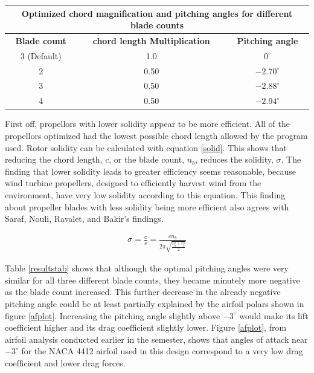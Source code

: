\documentclass[journal ]{new-aiaa}
\begin{document}
\begin{center}
\label{resultstab}
\begin{tabular}{| c | c | c |}
	 \multicolumn{3}{c}{\textbf{Optimized chord magnification and pitching angles for different blade counts}}  \\ \hline
  	 \textbf{Blade count} & \textbf{chord length Multiplication} & \textbf{Pitching angle} \\ \hline
  	 3 (Default) & 1.0 & $0^{\circ}$ \\ \hline
  	 2 & 0.50 & $-2.70^{\circ}$ \\ \hline
  	 3 & 0.50 & $-2.88^{\circ}$ \\ \hline
  	 4 & 0.50 & $-2.94^{\circ}$ \\ \hline
\end{tabular}
\end{center}

First off, propellors with lower solidity appear to be more efficient. All of the propellors optimized had the lowest possible chord length allowed by the program used. Rotor solidity can be calculated with equation \ref{solid}. This shows that reducing the chord length, $c$, or the blade count, $n_{b}$, reduces the solidity, $\sigma$. The finding that lower solidity leads to greater efficiency seems reasonable, because wind turbine propellers, designed to efficiently harvest wind from the environment, have very low solidity according to this equation. This finding about propeller blades with less solidity being more efficient also agrees with Saraf, Nouli, Ravalet, and Bakir's findings.\cite{AxFlFan} 

\begin{equation}
	\begin{aligned}
	\label{solid}
	\sigma = \frac{c}{s} = \frac{c n_{b}}{2 \pi \sqrt{\frac{r_{h}^{2}+r_{t}^{2}}{2}}}
\end{aligned}
\end{equation}

Table \ref{resultstab} shows that although the optimal pitching angles were very similar for all three different blade counts, they became minutely more negative as the blade count increased. This further decrease in the already negative pitching angle could be at least partially explained by the airfoil polars shown in figure \ref{afplot}. Increasing the pitching angle slightly above $-3^{\circ}$ would make its lift coefficient higher and its drag coefficient slightly lower. Figure \ref{afplot}, from airfoil analysis conducted earlier in the semester, shows that angles of attack near $-3^{\circ}$ for the NACA 4412 airfoil used in this design correspond to a very low drag coefficient and lower drag forces.
\end{document}
